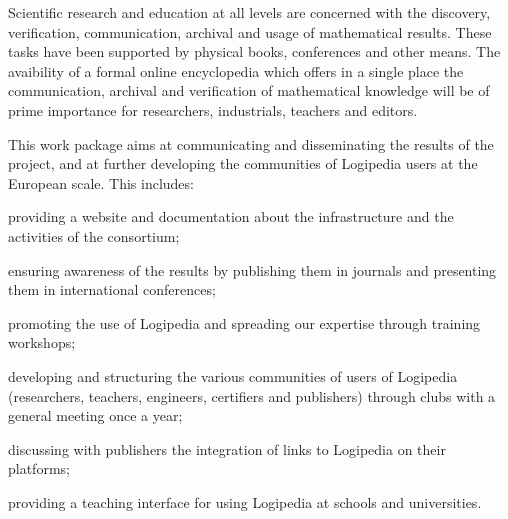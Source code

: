 \begin{workpackage}[id=dissemination,type=MGT,wphases=1-48,
  short={Dissemination},
  title={Dissemination, communication and exploitation},
  lead=Lie,LieRM=2,InrRM=6,BirRM=4,CleRM=2,ImtRM=2,StrRM=2,ZibRM=14,EduRM=12]

  \begin{wpobjectives}
    Scientific research and education at all levels are concerned with
    the discovery, verification, communication, archival and usage of
    mathematical results. These tasks have been supported by physical
    books, conferences and other means. The avaibility of a formal
    online encyclopedia which offers in a single place the
    communication, archival and verification of mathematical knowledge
    will be of prime importance for researchers, industrials, teachers
    and editors.

    This work package aims at communicating and disseminating the
    results of the project, and at further developing the communities
    of Logipedia users at the European scale. This includes:
    \begin{compactitem}
    \item providing a website and documentation about the
      infrastructure and the activities of the consortium;
    \item ensuring awareness of the results by publishing them in
      journals and presenting them in international conferences;
    \item promoting the use of Logipedia and spreading our expertise
      through training workshops;
    \item developing and structuring the various communities of users
      of Logipedia (researchers, teachers, engineers, certifiers and
      publishers) through clubs with a general meeting once a year;
    \item discussing with publishers the integration of links to
      Logipedia on their platforms;
    \item providing a teaching interface for using Logipedia at
      schools and universities.
    \end{compactitem}
  \end{wpobjectives}



\end{workpackage}
